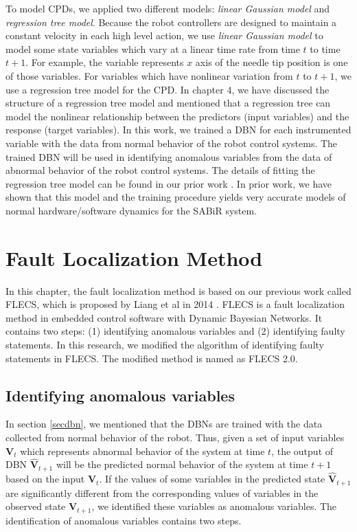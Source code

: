 To model CPDs, we applied two different models: {\it linear Gaussian model} and {\it regression tree model}. Because the robot controllers are designed to maintain a constant velocity in each high level action, we use {\it linear Gaussian model} to model some state variables which vary at a linear time rate from time $t$ to time $t+1$. For example, the variable represents $x$ axis of the needle tip position is one of those variables. For variables which have nonlinear variation from $t$ to $t+1$, we use a regression tree model for the CPD. In chapter 4, we have discussed the structure of a regression tree model and mentioned that a regression tree can model the nonlinear relationship between the predictors (input variables) and the response (target variables). In this work, we trained a DBN for each instrumented variable with the data from normal behavior of the robot control systems. The trained DBN will be used in identifying anomalous variables from the data of abnormal behavior of the robot control systems. The details of fitting the regression tree model can be found in our prior work \cite{cao2012classification}. In prior work, we have shown that this model and the training procedure yields very accurate models of normal hardware/software dynamics for the SABiR system. 

\section{Fault Localization Method}\label{dbnflalg}
In this chapter, the fault localization method is based on our previous work called FLECS, which is proposed by Liang et al in 2014 \cite{liang2015fault}. FLECS is a fault localization method in embedded control software with Dynamic Bayesian Networks. It contains two steps: (1) identifying anomalous variables and (2) identifying faulty statements. In this research, we modified the algorithm of identifying faulty statements in FLECS. The modified method is named as FLECS 2.0. 

\subsection{Identifying anomalous variables}
In section \ref{secdbn}, we mentioned that the DBNs are trained with the data collected from normal behavior of the robot. Thus, given a set of input variables ${\pmb{V}_t}$ which represents abnormal behavior of the system at time $t$, the output of DBN $ {\pmb{{\hat V}}_{t + 1}} $ will be the predicted normal behavior of the system at time $t+1$ based on the input ${\pmb{V}_t} $. If the values of some variables in the predicted state $ {\pmb{{\hat V}}_{t + 1}} $ are significantly different from the corresponding values of variables in the observed state  $ {\pmb{V}_{t + 1}} $, we identified these variables as anomalous variables. The identification of anomalous variables contains two steps.

